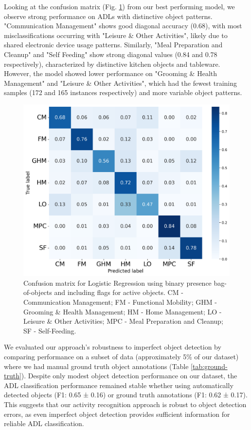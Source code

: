 \documentclass[journal,twoside,web]{ieeecolor}
\begin{document}
Looking at the confusion matrix (Fig. \ref{fig:cm}) from our best performing model, we observe strong performance on ADLs with distinctive object patterns. "Communication Management" shows good diagonal accuracy (0.68), with most misclassifications occurring with "Leisure \& Other Activities", likely due to shared electronic device usage patterns. Similarly, "Meal Preparation and Cleanup" and "Self Feeding" show strong diagonal values (0.84 and 0.78 respectively), characterized by distinctive kitchen objects and tableware. However, the model showed lower performance on "Grooming \& Health Management" and "Leisure \& Other Activities", which had the fewest training samples (172 and 165 instances respectively) and more variable object patterns.

\begin{figure}[h]
    \centering
    \includegraphics[width=1\linewidth]{figs/LR-confusion-matrix-10x8.png}
    \caption{Confusion matrix for Logistic Regression using binary presence bag-of-objects and including flags for active objects. CM - Communication Management; FM - Functional Mobility; GHM - Grooming \& Health Management; HM - Home Management; LO - Leisure \& Other Activities; MPC - Meal Preparation and Cleanup; SF - Self-Feeding.}
    \label{fig:cm}
\end{figure}

We evaluated our approach's robustness to imperfect object detection by comparing performance on a subset of data (approximately 5\% of our dataset) where we had manual ground truth object annotations (Table \ref{tab:ground-truth}). Despite only modest object detection performance on our dataset, the ADL classification performance remained stable whether using automatically detected objects (F1: 0.65 ± 0.16) or ground truth annotations (F1: 0.62 ± 0.17). This suggests that our activity recognition approach is robust to object detection errors, as even imperfect object detection provides sufficient information for reliable ADL classification.
\end{document}
